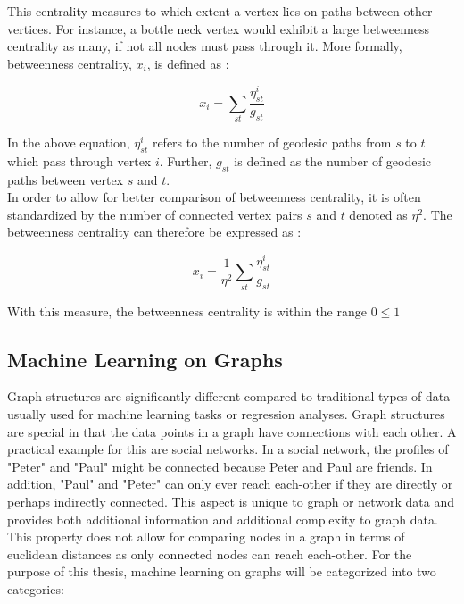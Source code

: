 	This centrality measures to which extent a vertex lies on paths between
	other vertices. For instance, a bottle neck vertex would exhibit a large
	betweenness centrality as many, if not all nodes must pass through it. More
	formally, betweenness centrality, $x_i$, is defined as \citep[p.
	187]{Newman2010}:

	\begin{equation}
		x_i = \sum_{st} \frac{\eta_{st}^i}{g_{st}}
	\end{equation}

	\noindent In the above equation, $\eta_{st}^i$ refers to the number of 
	geodesic paths from $s$ to $t$ which pass through vertex $i$. Further,
	$g_{st}$ is defined as the number of geodesic paths between vertex $s$ and
	$t$. \\

	\noindent In order to allow for better comparison of betweenness
	centrality, it is often standardized by the number of connected vertex
	pairs $s$ and $t$ denoted as  $\eta^2$. The betweenness centrality
	can therefore be expressed as \citep[p.190]{Newman2010}:

	\begin{equation}
		x_i = \frac{1}{\eta^2}\sum_{st} \frac{\eta_{st}^i}{g_{st}}
	\end{equation}

	\noindent With this measure, the betweenness centrality is within the range
	$0\leqslant1$

	\subsection{Machine Learning on Graphs}

	\noindent Graph structures are significantly different compared to
	traditional types of data usually used for machine learning tasks or
	regression analyses. Graph structures are special in that the data points
	in a graph have connections with each other. A practical example for this
	are social networks. In a social network, the profiles of "Peter" and
	"Paul" might be connected because Peter and Paul are friends. In addition,
	"Paul" and "Peter" can only ever reach each-other if they are directly or
	perhaps indirectly connected. This aspect is unique to graph or network data 
	and provides both additional information and additional complexity to graph 
	data. This property does not allow for comparing nodes in a graph in terms
	of euclidean distances as only connected nodes can reach each-other. For
	the purpose of this thesis, machine learning on graphs will be categorized
	into two categories:

